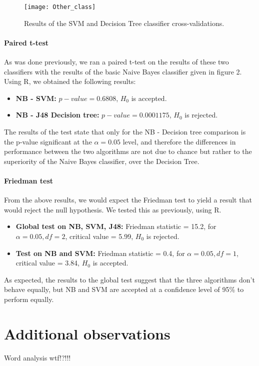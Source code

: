 \documentclass[12pt,a4paper]{report}
\begin{document}
\begin{figure}
\texttt{[image: Other\_class]}
\centering
\caption{Results of the SVM and Decision Tree classifier cross-validations.}
\end{figure}

\paragraph*{Paired t-test}
As was done previously, we ran a paired t-test on the results of these two classifiers with the results of the basic Naive Bayes classifier given in figure 2. Using R, we obtained the following results:

\begin{itemize}
\item \textbf{NB - SVM:} $ p-value = 0.6808 $, $ H_0 $ is accepted.
\item \textbf{NB - J48 Decision tree:} $ p-value = 0.0001175 $, $ H_0 $ is rejected. 
\end{itemize}

The results of the test state that only for the NB - Decision tree comparison is the p-value significant at the $ \alpha = 0.05 $ level, and therefore the differences in performance between the two algorithms are not due to chance but rather to the superiority of the Naive Bayes classifier, over the Decision Tree.

\paragraph*{Friedman test}
From the above results, we would expect the Friedman test to yield a result that would reject the null hypothesis. We tested this as previously, using R.

\begin{itemize}
\item \textbf{Global test on NB, SVM, J48:} Friedman statistic = 15.2, for $ \alpha = 0.05, df = 2 $, critical value = 5.99, $ H_0 $ is rejected.
\item \textbf{Test on NB and SVM:} Friedman statistic = 0.4, for $ \alpha = 0.05, df = 1 $, critical value = 3.84, $ H_0 $ is accepted.
\end{itemize}

As expected, the results to the global test suggest that the three algorithms don't behave equally, but NB and SVM are accepted at a confidence level of 95\% to perform equally.

\section{Additional observations}
Word analysis wtf!?!!!
\end{document}
